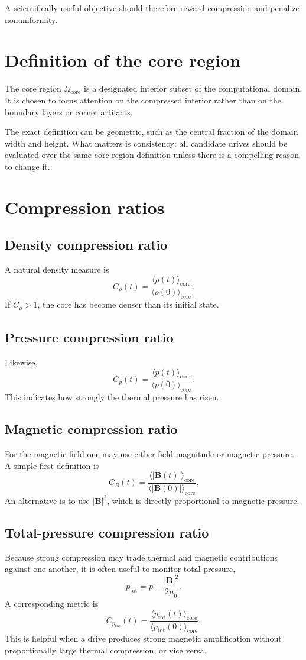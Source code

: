 \documentclass[11pt]{article}
\begin{document}
A scientifically useful objective should therefore reward compression and penalize nonuniformity.

\section{Definition of the core region}
The core region $\Omega_{\text{core}}$ is a designated interior subset of the computational domain. It is chosen to focus attention on the compressed interior rather than on the boundary layers or corner artifacts.

The exact definition can be geometric, such as the central fraction of the domain width and height. What matters is consistency: all candidate drives should be evaluated over the same core-region definition unless there is a compelling reason to change it.

\section{Compression ratios}
\subsection{Density compression ratio}
A natural density measure is
\[
C_{\rho}(t) = \frac{\langle \rho(t)\rangle_{\text{core}}}{\langle \rho(0)\rangle_{\text{core}}}.
\]
If $C_{\rho}>1$, the core has become denser than its initial state.

\subsection{Pressure compression ratio}
Likewise,
\[
C_p(t) = \frac{\langle p(t)\rangle_{\text{core}}}{\langle p(0)\rangle_{\text{core}}}.
\]
This indicates how strongly the thermal pressure has risen.

\subsection{Magnetic compression ratio}
For the magnetic field one may use either field magnitude or magnetic pressure. A simple first definition is
\[
C_B(t) = \frac{\langle |\mathbf{B}(t)|\rangle_{\text{core}}}{\langle |\mathbf{B}(0)|\rangle_{\text{core}}}.
\]
An alternative is to use $|\mathbf{B}|^2$, which is directly proportional to magnetic pressure.

\subsection{Total-pressure compression ratio}
Because strong compression may trade thermal and magnetic contributions against one another, it is often useful to monitor total pressure,
\[
p_{\mathrm{tot}} = p + \frac{|\mathbf{B}|^2}{2\mu_0}.
\]
A corresponding metric is
\[
C_{p_{\mathrm{tot}}}(t) = \frac{\langle p_{\mathrm{tot}}(t)\rangle_{\text{core}}}{\langle p_{\mathrm{tot}}(0)\rangle_{\text{core}}}.
\]
This is helpful when a drive produces strong magnetic amplification without proportionally large thermal compression, or vice versa.
\end{document}
